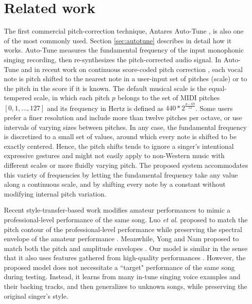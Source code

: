 \section{Related work}
The first commercial pitch-correction technique, Antares Auto-Tune \cite{antares:2016}, is also one of the most commonly used. Section \ref{sec:autotune} describes in detail how it works. Auto-Tune measures the fundamental frequency of the input monophonic singing recording, then re-synthesizes the pitch-corrected audio signal. In Auto-Tune and in recent work on continuous score-coded pitch correction \cite{salazar2015continuous}, each vocal note is pitch shifted to the nearest note in a user-input set of pitches (scale) or to the pitch in the score if it is known. The default musical scale is the equal-tempered scale, in which each pitch $p$ belongs to the set of MIDI pitches $[0, 1, ..., 127]$ and its frequency in Hertz is defined as $440*2^{\frac{p-69}{12}}$. Some users prefer a finer resolution and include more than twelve pitches per octave, or use intervals of varying sizes between pitches. In any case, the fundamental frequency is discretized to a small set of values, around which every note is shifted to be exactly centered. Hence, the pitch shifts tends to ignore a singer's intentional expressive gestures and might not easily apply to non-Western music with different scales or more fluidly varying pitch. The proposed system accommodates this variety of frequencies by letting the fundamental frequency take any value along a continuous scale, and by shifting every note by a constant without modifying internal pitch variation.

Recent style-transfer-based work modifies amateur performances to mimic a professional-level performance of the same song. Luo \textit{et al.} proposed to match the pitch contour of the professional-level performance while preserving the spectral envelope of the amateur performance \cite{luo2018singing}. Meanwhile, Yong and Nam proposed to match both the pitch and amplitude envelopes \cite{yong2018singing}. Our model is similar in the sense that it also uses features gathered from high-quality performances \cite{wager2018intonation}. However, the proposed model does not necessitate a ``target" performance of the same song during testing. Instead, it learns from many in-tune singing voice examples and their backing tracks, and then generalizes to unknown songs, while preserving the original singer's style.

